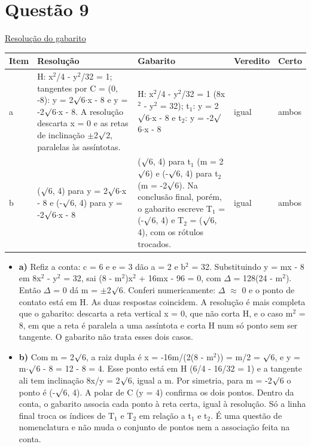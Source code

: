 \documentclass{article}%
\begin{document}
\section*{Questão 9}%
\href{https://poliedroresolve.sistemapoliedro.com.br/vestibulares/ita/2026/ita-2-fase-dia-1-28-10-2025-2-fase-dia-1/dissertativa-9-matematica-2-fase-dia-1-ita-2026}{Resolução do gabarito}\par\smallskip%
\begin{longtable}{@{}p{} p{} p{} p{} p{}@{}}\toprule Item & Resolução & Gabarito & Veredito & Certo \\ \midrule
a & H: x$^2$/4 - y$^2$/32 = 1; tangentes por C = (0, -8): y = 2$\surd$6$\cdot$x - 8 e y = -2$\surd$6$\cdot$x - 8. A resolução descarta x = 0 e as retas de inclinação $\pm$2$\surd$2, paralelas às assíntotas. & H: x$^2$/4 - y$^2$/32 = 1 (8x$^2$ - y$^2$ = 32); t$_{1}$: y = 2$\surd$6$\cdot$x - 8 e t$_{2}$: y = -2$\surd$6$\cdot$x - 8 & igual & ambos \\
b & ($\surd$6, 4) para y = 2$\surd$6$\cdot$x - 8 e (-$\surd$6, 4) para y = -2$\surd$6$\cdot$x - 8 & ($\surd$6, 4) para t$_{1}$ (m = 2$\surd$6) e (-$\surd$6, 4) para t$_{2}$ (m = -2$\surd$6). Na conclusão final, porém, o gabarito escreve T$_{1}$ = (-$\surd$6, 4) e T$_{2}$ = ($\surd$6, 4), com os rótulos trocados. & igual & ambos \\
\bottomrule\end{longtable}%
\begin{itemize}%
\item%
\textbf{a)} Refiz a conta: c = 6 e e = 3 dão a = 2 e b$^2$ = 32. Substituindo y = mx - 8 em 8x$^2$ - y$^2$ = 32, sai (8 - m$^2$)x$^2$ + 16mx - 96 = 0, com $\Delta$ = 128(24 - m$^2$). Então $\Delta$ = 0 dá m = $\pm$2$\surd$6. Conferi numericamente: $\Delta$ $\approx$ 0 e o ponto de contato está em H. As duas respostas coincidem. A resolução é mais completa que o gabarito: descarta a reta vertical x = 0, que não corta H, e o caso m$^2$ = 8, em que a reta é paralela a uma assíntota e corta H num só ponto sem ser tangente. O gabarito não trata esses dois casos.%
\item%
\textbf{b)} Com m = 2$\surd$6, a raiz dupla é x = -16m/(2(8 - m$^2$)) = m/2 = $\surd$6, e y = m$\cdot$$\surd$6 - 8 = 12 - 8 = 4. Esse ponto está em H (6/4 - 16/32 = 1) e a tangente ali tem inclinação 8x/y = 2$\surd$6, igual a m. Por simetria, para m = -2$\surd$6 o ponto é (-$\surd$6, 4). A polar de C (y = 4) confirma os dois pontos. Dentro da conta, o gabarito associa cada ponto à reta certa, igual à resolução. Só a linha final troca os índices de T$_{1}$ e T$_{2}$ em relação a t$_{1}$ e t$_{2}$. É uma questão de nomenclatura e não muda o conjunto de pontos nem a associação feita na conta.%
\end{itemize}%
\end{document}
